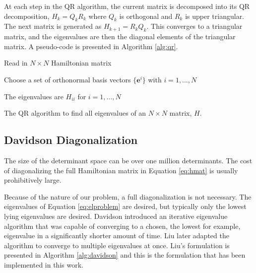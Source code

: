 \documentclass[final,3p,times,twocolumn]{elsarticle}
\begin{document}
At each step in the QR algorithm, the current matrix is decomposed into its QR decomposition, $H_k = Q_kR_k$ where $Q_k$ is orthogonal and $R_k$ is upper triangular. The next matrix is generated as $H_{k+1} = R_kQ_k$. This converges to a triangular matrix, and the eigenvalues are then the diagonal elements of the triangular matrix. A pseudo-code is presented in Algorithm \ref{alg:qr}.

\begin{algorithm}
 Read in $N \times N$ Hamiltonian matrix\;
 
 Choose a set of orthonormal basis vectors $\{\mathbf{e}^i\}$ with $i = 1,  \ldots, N$\;
 
 The eigenvalues are $H_{ii}$ for $i = 1, \ldots, N$\;
\caption{The QR algorithm to find all eigenvalues of an $N 
\times N$ matrix, $H$.} 
\label{alg:qr}
\end{algorithm}

\subsection{Davidson Diagonalization} \label{sec:davidson}
The size of the determinant space can be over one million determinants. The cost of diagonalizing the full Hamiltonian matrix in Equation \eqref{eq:hmat} is usually prohibitively large. %

Because of the nature of our problem, a full diagonalization is not necessary. The eigenvalues of Equation \eqref{eq:elproblem} are desired, but typically only the lowest lying eigenvalues are desired. Davidson introduced an iterative eigenvalue algorithm that was capable of converging to a chosen, the lowest for example, eigenvalue in a significantly shorter amount of time.\cite{davidson} Liu later adapted the algorithm to converge to multiple eigenvalues at once.\cite{liu} Liu's formulation is presented in Algorithm \ref{alg:davidson} and this is the formulation that has been implemented in this work.
\end{document}
